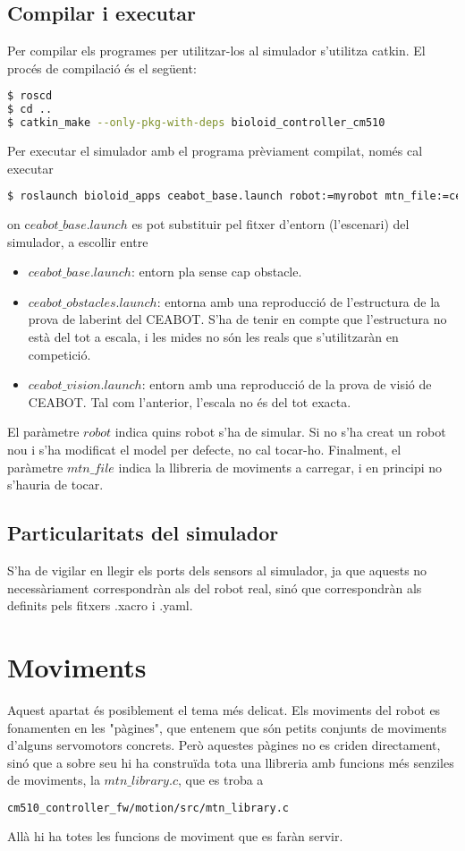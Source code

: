 \documentclass{article}
\begin{document}
\subsection{Compilar i executar}
Per compilar els programes per utilitzar-los al simulador s'utilitza catkin. El procés de compilació és el següent:
\begin{lstlisting}[language=bash]
$ roscd
$ cd ..
$ catkin_make --only-pkg-with-deps bioloid_controller_cm510
\end{lstlisting}

Per executar el simulador amb el programa prèviament compilat, només cal executar
\begin{lstlisting}[language=bash]
$ roslaunch bioloid_apps ceabot_base.launch robot:=myrobot mtn_file:=ceabot_motions
\end{lstlisting}
on c$eabot\_base.launch$ es pot substituir pel fitxer d'entorn (l'escenari) del simulador, a escollir entre
\begin{itemize}
\item $ceabot\_base.launch$: entorn pla sense cap obstacle.
\item $ceabot\_obstacles.launch$: entorna amb una reproducció de l'estructura de la prova de laberint del CEABOT. S'ha de tenir en compte que l'estructura no està del tot a escala, i les mides no són les reals que s'utilitzaràn en competició.
\item $ceabot\_vision.launch$: entorn amb una reproducció de la prova de visió de CEABOT. Tal com l'anterior, l'escala no és del tot exacta.
\end{itemize}
El paràmetre $robot$ indica quins robot s'ha de simular. Si no s'ha creat un robot nou i s'ha modificat el model per defecte, no cal tocar-ho. Finalment, el paràmetre $mtn\_file$ indica la llibreria de moviments a carregar, i en principi no s'hauria de tocar.

\subsection{Particularitats del simulador}
S'ha de vigilar en llegir els ports dels sensors al simulador, ja que aquests no necessàriament correspondràn als del robot real, sinó que correspondràn als definits pels fitxers .xacro i .yaml.



\section{Moviments}
Aquest apartat és posiblement el tema més delicat. Els moviments del robot es fonamenten en les "pàgines", que entenem que són petits conjunts de moviments d'alguns servomotors concrets. Però aquestes pàgines no es criden directament, sinó que a sobre seu hi ha construïda tota una llibreria amb funcions més senziles de moviments, la $mtn\_library.c$, que es troba a 
\begin{lstlisting}[language=bash]
cm510_controller_fw/motion/src/mtn_library.c
\end{lstlisting}
Allà hi ha totes les funcions de moviment que es faràn servir. 
\end{document}
